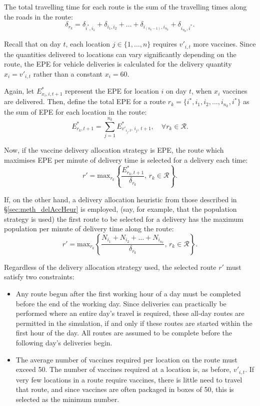 The total travelling time for each route is the sum of the travelling times along the roads in the route:
$$\delta_{r_{k}} = \delta_{i^{*},i_{1}} + \delta_{i_{1},i_{2}} + \dots + \delta_{i_{(n_{k}-1)},i_{n_{k}}} + \delta_{i_{n_{k}}, i^{*}}.$$

Recall that on day $t$, each location $j \in \{1,\dots,n\}$ requires $v'_{i,t}$ more vaccines. Since the quantities delivered to locations can vary significantly depending on the route, the EPE for vehicle deliveries is calculated for the delivery quantity $x_{i} = v'_{i,t}$ rather than a constant $x_{i} = 60$.

Again, let $E^{*}_{x_{i},i,t+1}$ represent the EPE for location $i$ on day $t$, when $x_{i}$ vaccines are delivered. 
Then, define the total EPE for a route $r_{k} =  \{i^{*},i_{1},i_{2},\dots,i_{n_{k}},i^{*}\}$ as the sum of EPE for each location in the route:
$$E^{*}_{r_{k},t+1} = \sum^{n_{k}}_{j=1} E^{*}_{v'_{i_{j},t},\, i_{j},\, t+1}, \quad \forall{r_{k}} \in \mathcal{R}.$$

Now, if the vaccine delivery allocation strategy is EPE, the route which maximises EPE per minute of delivery time is selected for a delivery each time:
$$r' = \text{max}_{r_{k}}\left\{ \frac{E^{*}_{r_{k},t+1}}{\delta_{r_{k}}}, \, r_{k} \in \mathcal{R} \right\}.$$ 

If, on the other hand, a delivery allocation heuristic from those described in \S \ref{sec:meth_delAccHeur} is employed, (say, for example, that the population strategy is used) the first route to be selected for a delivery has the maximum population per minute of delivery time along the route:
$$r' = \text{max}_{r_{k}}\left\{ \frac{N_{i_{1}}+N_{i_{2}}+\dots+N_{i_{n_{k}}}}{\delta_{r_{k}}}, \, r_{k} \in \mathcal{R} \right\}.$$ 

Regardless of the delivery allocation strategy used, the selected route $r'$ must satisfy two constraints:
\begin{itemize}
    \item Any route begun after the first working hour of a day must be completed before the end of the working day. Since deliveries can practically be performed where an entire day's travel is required, these all-day routes are permitted in the simulation, if and only if these routes are started within the first hour of the day. All routes are assumed to be complete before the following day's deliveries begin.
    \item The average number of vaccines required per location on the route must exceed 50. The number of vaccines required at a location is, as before, $v'_{i,t}$. If very few locations in a route require vaccines, there is little need to travel that route, and since vaccines are often packaged in boxes of 50, this is selected as the minimum number.
\end{itemize}

